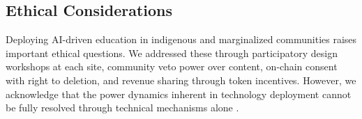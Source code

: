 \subsection{Ethical Considerations}

Deploying AI-driven education in indigenous and marginalized communities raises important ethical questions.
We addressed these through participatory design workshops at each site, community veto power over content, on-chain consent with right to deletion, and revenue sharing through token incentives.
However, we acknowledge that the power dynamics inherent in technology deployment cannot be fully resolved through technical mechanisms alone \citep{couldry2019data}.

